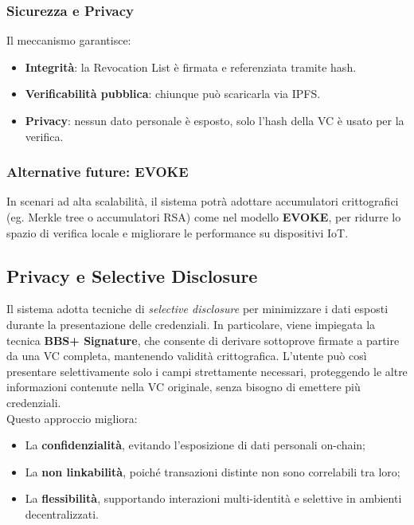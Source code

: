            \subsubsection{Sicurezza e Privacy}
                \noindent Il meccanismo garantisce:
                    \begin{itemize}
                        \item \textbf{Integrità}: la Revocation List è firmata e referenziata tramite hash.
                        
                        \item \textbf{Verificabilità pubblica}: chiunque può scaricarla via IPFS.
                        
                        \item \textbf{Privacy}: nessun dato personale è esposto, solo l’hash della VC è usato per la verifica.
                    \end{itemize}
                
            \subsubsection{Alternative future: EVOKE}
                \noindent In scenari ad alta scalabilità, il sistema potrà adottare accumulatori crittografici (eg. Merkle tree o accumulatori RSA) come nel modello \textbf{EVOKE}, per ridurre lo spazio di verifica locale e migliorare le performance su dispositivi IoT.
                
        \subsection{Privacy e Selective Disclosure}
            Il sistema adotta tecniche di \textit{selective disclosure} per minimizzare i dati esposti durante la presentazione delle credenziali. In particolare, viene impiegata la tecnica \textbf{BBS+ Signature}, che consente di derivare sottoprove firmate a partire da una VC completa, mantenendo validità crittografica.
            L'utente può così presentare selettivamente solo i campi strettamente necessari, proteggendo le altre informazioni contenute nella VC originale, senza bisogno di emettere più credenziali. \\
            
            \noindent Questo approccio migliora:
                \begin{itemize}
                    \item La \textbf{confidenzialità}, evitando l'esposizione di dati personali on-chain;
                    
                    \item La \textbf{non linkabilità}, poiché transazioni distinte non sono correlabili tra loro;
                    
                    \item La \textbf{flessibilità}, supportando interazioni multi-identità e selettive in ambienti decentralizzati.
                \end{itemize}

